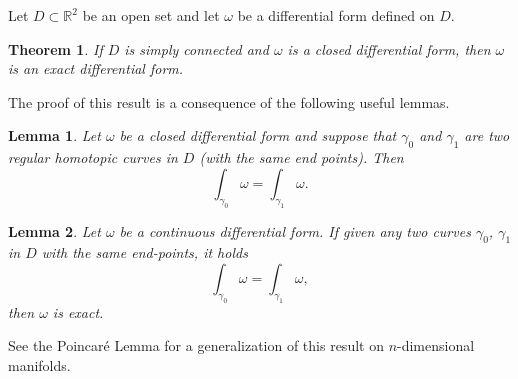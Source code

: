 \documentclass[12pt]{article}
\newtheorem{theorem}{Theorem}
\newtheorem{lemma}{Lemma}
\begin{document}
Let $D\subset \mathbb R^2$ be an open set and let $\omega$ be a differential form defined on $D$.

\begin{theorem}
If $D$ is simply connected and $\omega$ is a closed differential form,
then $\omega$ is an exact differential form.
\end{theorem}

The proof of this result is a consequence of the following useful lemmas.

\begin{lemma}
Let $\omega$ be a closed differential form 
and suppose that $\gamma_0$ and $\gamma_1$ are two regular homotopic curves in $D$ (with the same end points). Then 
\[
  \int_{\gamma_0} \omega = \int_{\gamma_1}\omega.
\]
\end{lemma}

\begin{lemma}
Let $\omega$ be a continuous differential form.
If given any two curves $\gamma_0$, $\gamma_1$ in $D$ with the same end-points,
it holds
\[
  \int_{\gamma_0} \omega = \int_{\gamma_1} \omega,
\]
then $\omega$ is exact.
\end{lemma}

See the Poincar\'e Lemma for a generalization of this result on $n$-dimensional manifolds.
\end{document}
